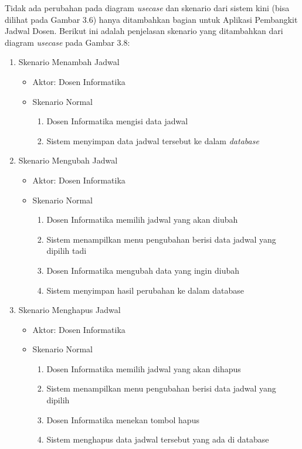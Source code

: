 Tidak ada perubahan pada diagram \textit{usecase} dan skenario dari sistem kini (bisa dilihat pada Gambar 3.6) hanya ditambahkan bagian untuk Aplikasi Pembangkit Jadwal Dosen. Berikut ini adalah penjelasan skenario yang ditambahkan dari diagram \textit{usecase} pada Gambar 3.8:
\begin{enumerate}
	\item Skenario Menambah Jadwal
	\begin{itemize}
		\item Aktor: Dosen Informatika
		\item Skenario Normal
			\begin{enumerate}[1.]
				\item Dosen Informatika mengisi data jadwal
				\item Sistem menyimpan data jadwal tersebut ke dalam \textit{database}
			\end{enumerate}
	\end{itemize}

	\item Skenario Mengubah Jadwal
	\begin{itemize}
		\item Aktor: Dosen Informatika
		\item Skenario Normal
			\begin{enumerate}[1.]
				\item Dosen Informatika memilih jadwal yang akan diubah
				\item Sistem menampilkan menu pengubahan berisi data jadwal yang dipilih tadi
				\item Dosen Informatika mengubah data yang ingin diubah
				\item Sistem menyimpan hasil perubahan ke dalam database
			\end{enumerate}
	\end{itemize}


	\item Skenario Menghapus Jadwal
	\begin{itemize}
		\item Aktor: Dosen Informatika
		\item Skenario Normal
			\begin{enumerate}[1.]
				\item Dosen Informatika memilih jadwal yang akan dihapus
				\item Sistem menampilkan menu pengubahan berisi data jadwal yang dipilih
				\item Dosen Informatika menekan tombol hapus
				\item Sistem menghapus data jadwal tersebut yang ada di database
			\end{enumerate}
	\end{itemize}


\end{enumerate}
